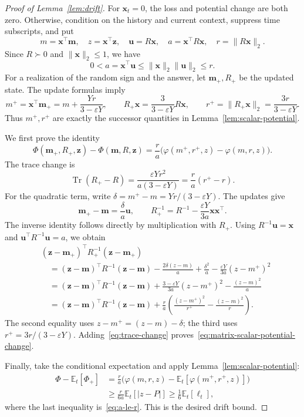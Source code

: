 \documentclass[11pt]{article}
\newcommand{\Esub}[2]{\mathbb E_{#1}\left[#2\right]}
\DeclareMathOperator{\Tr}{Tr}
\newcommand{\norm}[1]{\lVert #1\rVert_2}
\newcommand{\bm}{\boldsymbol m}
\newcommand{\bx}{\boldsymbol x}
\newcommand{\bz}{\boldsymbol z}
\begin{document}
\begin{proof}[Proof of Lemma~\ref{lem:drift}]
For $\bx_t=0$, the loss and potential change are both zero. Otherwise, condition on the history and current context, suppress time subscripts, and put
\[
 m=\bx^\top\bm,\quad z=\bx^\top\bz,\quad
 \boldsymbol u=R\bx,\quad a=\bx^\top R\bx,\quad r=\norm{R\bx}.
\]
Since $R\succ0$ and $\norm{\bx}\le1$, we have
\begin{equation}\label{eq:a-le-r}
 0<a=\bx^\top\boldsymbol u\le\norm{\bx}\norm{\boldsymbol u}\le r.
\end{equation}
{For a realization of the random sign and the answer}, let $\bm_+,R_+$ be the updated state. The update formulas imply
\[
 m^+=\bx^\top\bm_+=m+\frac{Yr}{3-\varepsilon Y},
 \qquad R_+\bx=\frac3{3-\varepsilon Y}R\bx,
 \qquad r^+=\norm{R_+\bx}=\frac{3r}{3-\varepsilon Y}.
\]
Thus $m^+,r^+$ are exactly the successor quantities in Lemma~\ref{lem:scalar-potential}.

We first prove the identity
\begin{equation}\label{eq:matrix-scalar-potential-change}
 \Phi(\bm_+,R_+,\bz)-\Phi(\bm,R,\bz)
 =\frac ra\bigl(\varphi(m^+,r^+,z)-\varphi(m,r,z)\bigr).
\end{equation}
The trace change is
\begin{equation}\label{eq:trace-change}
 \Tr(R_+-R)=\frac{\varepsilon Y r^2}{a(3-\varepsilon Y)}=\frac ra(r^+-r).
\end{equation}
For the quadratic term, write $\delta=m^+-m=Yr/(3-\varepsilon Y)$. The updates give
\[
 \bm_+-\bm=\frac\delta a\boldsymbol u,
 \qquad R_+^{-1}=R^{-1}-\frac{\varepsilon Y}{3a}\bx\bx^\top.
\]
The inverse identity follows directly by multiplication with $R_+$. Using $R^{-1}\boldsymbol u=\bx$ and $\boldsymbol u^\top R^{-1}\boldsymbol u=a$, we obtain
\begin{align*}
 &(\bz-\bm_+)^\top R_+^{-1}(\bz-\bm_+)\\
 &\quad=(\bz-\bm)^\top R^{-1}(\bz-\bm)
       -\frac{2\delta(z-m)}a+\frac{\delta^2}a
       -\frac{\varepsilon Y}{3a}(z-m^+)^2\\
 &\quad=(\bz-\bm)^\top R^{-1}(\bz-\bm)
       +\frac{3-\varepsilon Y}{3a}(z-m^+)^2-\frac{(z-m)^2}a\\
 &\quad=(\bz-\bm)^\top R^{-1}(\bz-\bm)
       +\frac ra\left(\frac{(z-m^+)^2}{r^+}-\frac{(z-m)^2}r\right).
\end{align*}
The second equality uses $z-m^+=(z-m)-\delta$; the third uses $r^+=3r/(3-\varepsilon Y)$. Adding~\eqref{eq:trace-change} proves~\eqref{eq:matrix-scalar-potential-change}.

Finally, take the conditional expectation and apply Lemma~\ref{lem:scalar-potential}:
\begin{align*}
 \Phi-\Esub{t}{\Phi_+}
 &=\frac ra\bigl(\varphi(m,r,z)-\Esub{t}{\varphi(m^+,r^+,z)}\bigr)\\
 &\ge\frac r{6a}\Esub{t}{|z-P|}
 \ge\frac16\Esub{t}{\ell_t},
\end{align*}
where the last inequality is~\eqref{eq:a-le-r}. This is the desired drift bound.
\end{proof}
\end{document}

